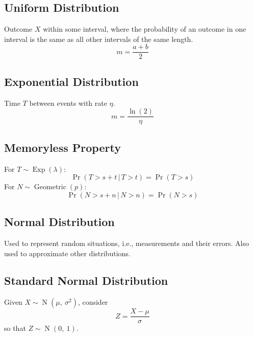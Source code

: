 \documentclass{article}
\begin{document}
\begin{minipage}{62.39259259mm}
    \subsection{Uniform Distribution}
    Outcome \(X\) within some interval, where the probability of an
    outcome in one interval is the same as all other intervals of the
    same length.
    \begin{equation*}
        m = \frac{a + b}{2}
    \end{equation*}
    \subsection{Exponential Distribution}
    Time \(T\) between events with rate \(\eta\).
    \begin{equation*}
        m = \frac{\ln{\left( 2 \right)}}{\eta}
    \end{equation*}
    \subsection{Memoryless Property}
    For \(T \sim \operatorname{Exp}{\left( \lambda \right)}\):
    \begin{equation*}
        \Pr{\left( T > s + t \,\vert\, T > t \right)} = \Pr{\left( T > s \right)}
    \end{equation*}
    For \(N \sim \operatorname{Geometric}{\left( p \right)}\):
    \begin{equation*}
        \Pr{\left( N > s + n \,\vert\, N > n \right)} = \Pr{\left( N > s \right)}
    \end{equation*}
    \subsection{Normal Distribution}
    Used to represent random situations, i.e., measurements and their
    errors. Also used to approximate other distributions.
    \subsection{Standard Normal Distribution}
    Given \(X \sim \operatorname{N}{\left( \mu,\: \sigma^2 \right)}\),
    consider
    \begin{equation*}
        Z = \frac{X - \mu}{\sigma}
    \end{equation*}
    so that \(Z \sim \operatorname{N}{\left( 0,\: 1 \right)}\).
\end{minipage}
\end{document}
